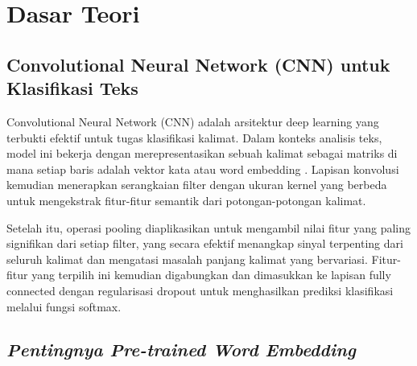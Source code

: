 \section{Dasar Teori} \label{II.Teori}

\subsection{ Convolutional Neural Network (CNN) untuk Klasifikasi Teks} \label{II.teori1}

Convolutional Neural Network (CNN) adalah arsitektur deep learning yang terbukti efektif untuk tugas klasifikasi kalimat. Dalam konteks analisis teks, model ini bekerja dengan merepresentasikan sebuah kalimat sebagai matriks di mana setiap baris adalah vektor kata atau word embedding \cite{razi2017klasifikasi}. Lapisan konvolusi kemudian menerapkan serangkaian filter dengan ukuran kernel yang berbeda untuk mengekstrak fitur-fitur semantik dari potongan-potongan kalimat. 

Setelah itu, operasi pooling diaplikasikan untuk mengambil nilai fitur yang paling signifikan dari setiap filter, yang secara efektif menangkap sinyal terpenting dari seluruh kalimat dan mengatasi masalah panjang kalimat yang bervariasi. Fitur-fitur yang terpilih ini kemudian digabungkan dan dimasukkan ke lapisan fully connected dengan regularisasi dropout untuk menghasilkan prediksi klasifikasi melalui fungsi softmax. \par

\subsection{\textit{Pentingnya Pre-trained Word Embedding}} \label{II.teori2}

